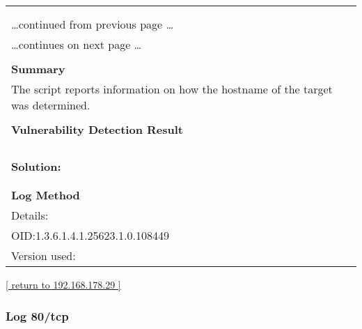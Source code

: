 \documentclass{article}
\begin{document}
\begin{longtable}{|p{}|}
\hline
\rowcolor{gvm_log}{\color{white}{Log (CVSS: 0.0) }}\\
\rowcolor{gvm_log}{\color{white}{NVT: Hostname Determination Reporting}}\\
\hline
\endfirsthead
\hfill\ldots continued from previous page \ldots \\
\hline
\endhead
\hline
\ldots continues on next page \ldots \\
\endfoot
\hline
\endlastfoot
\\
\textbf{Summary}\\
The script reports information on how the hostname
  of the target was determined.\\

        \hline
        \\
\textbf{Vulnerability Detection Result}\\
\rowcolor{white}{\verb=Hostname determination for IP 192.168.178.29:=}\\
\rowcolor{white}{\verb=Hostname|Source=}\\
\rowcolor{white}{\verb=wohn-tl-sg108e.fritz.box|Reverse-DNS=}\\

          \hline
          \\
\textbf{Solution:}\\
\\


        \hline
        \\
\textbf{Log Method}\\
Details:
\rowcolor{white}{\verb=Hostname Determination Reporting=}\\
OID:1.3.6.1.4.1.25623.1.0.108449\\
Version used:
\rowcolor{white}{\verb=2018-11-19T11:11:31Z=}\\
\end{longtable}

\begin{footnotesize}\hyperref[host:192.168.178.29]{[ return to 192.168.178.29 ]}\end{footnotesize}
\subsubsection{Log 80/tcp}
\label{port:192.168.178.29 80/tcp Log}
\end{document}
